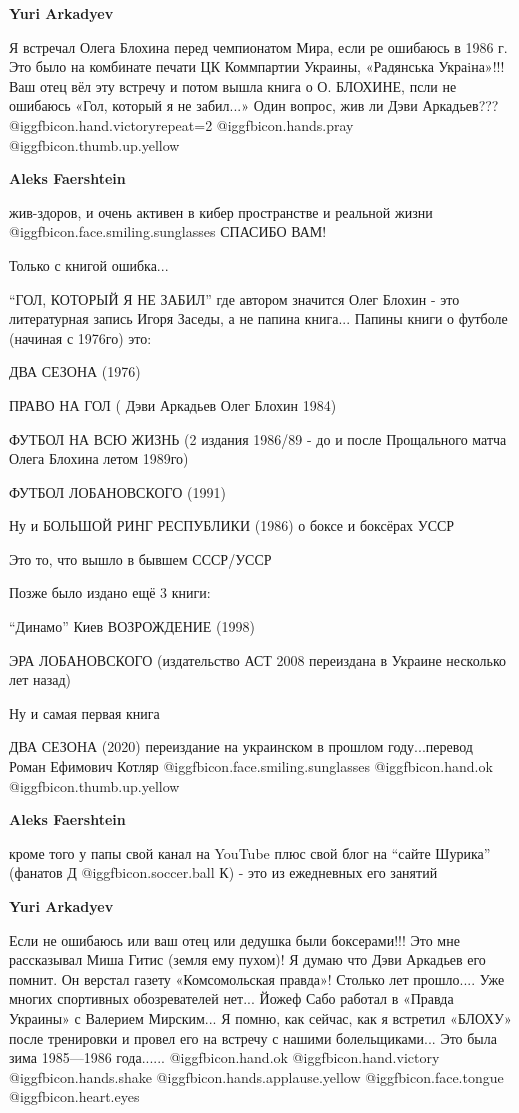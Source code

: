 \begin{itemize}
\begin{itemize}
\begin{itemize}
\textbf{Yuri Arkadyev} 

Я встречал Олега Блохина перед чемпионатом Мира, если ре ошибаюсь в 1986 г. Это
было на комбинате печати ЦК Коммпартии Украины, «Радянська Украiна»!!! Ваш отец
вёл эту встречу и потом вышла книга о О. БЛОХИНЕ, псли не ошибаюсь «Гол,
который я не забил...» Один вопрос, жив ли Дэви Аркадьев???@igg{fbicon.hand.victory}{repeat=2} @igg{fbicon.hands.pray}  @igg{fbicon.thumb.up.yellow} 


\textbf{Aleks Faershtein} 

жив-здоров, и очень активен в кибер пространстве и реальной жизни  @igg{fbicon.face.smiling.sunglasses} СПАСИБО ВАМ!

Только с книгой ошибка...

\enquote{ГОЛ, КОТОРЫЙ Я НЕ ЗАБИЛ} где автором значится Олег Блохин - это литературная
запись Игоря Заседы, а не папина книга...  Папины книги о футболе (начиная с
1976го) это:

ДВА СЕЗОНА (1976)

ПРАВО НА ГОЛ ( Дэви Аркадьев Олег Блохин 1984)

ФУТБОЛ НА ВСЮ ЖИЗНЬ (2 издания 1986/89 - до и после Прощального матча Олега
Блохина летом 1989го)

ФУТБОЛ ЛОБАНОВСКОГО (1991)

Ну и БОЛЬШОЙ РИНГ РЕСПУБЛИКИ (1986) о боксе и боксёрах УССР

Это то, что вышло в бывшем СССР/УССР

Позже было издано ещё 3 книги:

\enquote{Динамо} Киев ВОЗРОЖДЕНИЕ (1998)

ЭРА ЛОБАНОВСКОГО (издательство АСТ 2008 переиздана в Украине несколько лет
назад)

Ну и самая первая книга

ДВА СЕЗОНА (2020) переиздание на украинском в прошлом году...перевод Роман
Ефимович Котляр  @igg{fbicon.face.smiling.sunglasses}  @igg{fbicon.hand.ok}  @igg{fbicon.thumb.up.yellow} 

\textbf{Aleks Faershtein} 

кроме того у папы свой канал на YouTube плюс свой блог на \enquote{сайте Шурика}
(фанатов Д @igg{fbicon.soccer.ball} К) - это из ежедневных его занятий

\textbf{Yuri Arkadyev} 

Если не ошибаюсь или ваш отец или дедушка были боксерами!!! Это мне рассказывал
Миша Гитис (земля ему пухом)! Я думаю что Дэви Аркадьев его помнит. Он верстал
газету «Комсомольская правда»! Столько лет прошло.... Уже многих спортивных
обозревателей нет... Йожеф Сабо работал в «Правда Украины» с Валерием
Мирским... Я помню, как сейчас, как я встретил «БЛОХУ» после тренировки и
провел его на встречу с нашими болельщиками... Это была зима 1985—1986
года...... @igg{fbicon.hand.ok} @igg{fbicon.hand.victory} @igg{fbicon.hands.shake}  @igg{fbicon.hands.applause.yellow}  @igg{fbicon.face.tongue}  @igg{fbicon.heart.eyes} 


\end{itemize}
\end{itemize}
\end{itemize}
